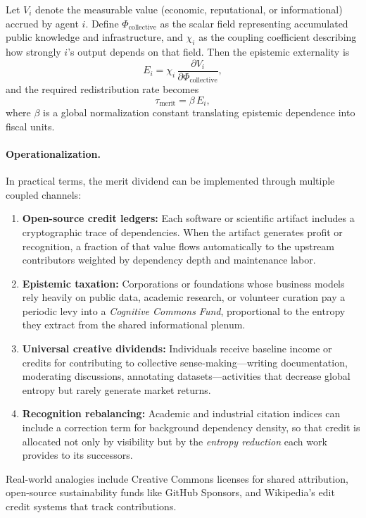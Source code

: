 \documentclass[12pt]{article}
\begin{document}
Let $V_i$ denote the measurable value (economic, reputational, or informational) accrued by agent $i$. Define $\Phi_\text{collective}$ as the scalar field representing accumulated public knowledge and infrastructure, and $\chi_i$ as the coupling coefficient describing how strongly $i$'s output depends on that field. Then the epistemic externality is
\[
E_i = \chi_i \, \frac{\partial V_i}{\partial \Phi_\text{collective}},
\]
and the required redistribution rate becomes
\[
\tau_\text{merit} = \beta \, E_i,
\]
where $\beta$ is a global normalization constant translating epistemic dependence into fiscal units.

\paragraph{Operationalization.}
In practical terms, the merit dividend can be implemented through multiple coupled channels:
\begin{enumerate}[label=(\alph*)]
    \item \textbf{Open-source credit ledgers:} Each software or scientific artifact includes a cryptographic trace of dependencies. When the artifact generates profit or recognition, a fraction of that value flows automatically to the upstream contributors weighted by dependency depth and maintenance labor.
    \item \textbf{Epistemic taxation:} Corporations or foundations whose business models rely heavily on public data, academic research, or volunteer curation pay a periodic levy into a \emph{Cognitive Commons Fund}, proportional to the entropy they extract from the shared informational plenum.
    \item \textbf{Universal creative dividends:} Individuals receive baseline income or credits for contributing to collective sense-making—writing documentation, moderating discussions, annotating datasets—activities that decrease global entropy but rarely generate market returns.
    \item \textbf{Recognition rebalancing:} Academic and industrial citation indices can include a correction term for background dependency density, so that credit is allocated not only by visibility but by the \emph{entropy reduction} each work provides to its successors.
\end{enumerate}

Real-world analogies include Creative Commons licenses for shared attribution, open-source sustainability funds like GitHub Sponsors, and Wikipedia's edit credit systems that track contributions.
\end{document}
